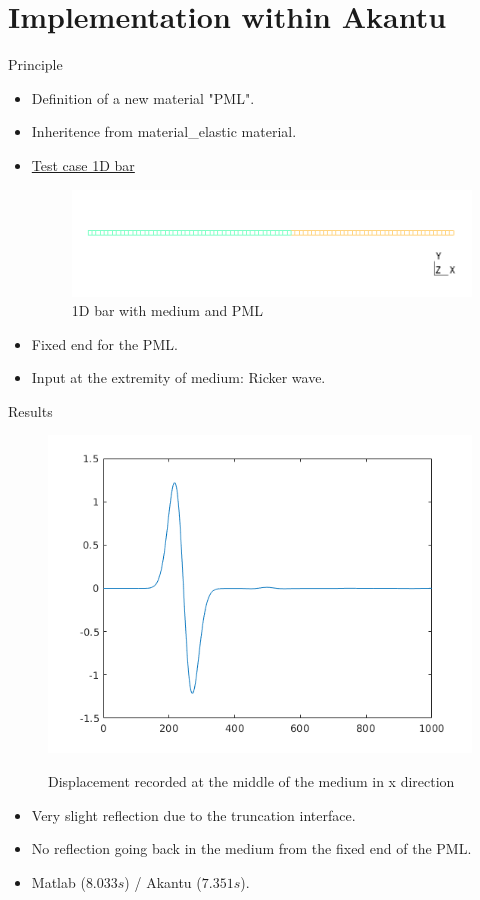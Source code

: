 \section{Implementation within Akantu}

\begin{frame}{Principle}
\centering
\begin{itemize}
\item Definition of a new material "PML".
\item Inheritence from material\_elastic material. 
\item \underline{Test case 1D bar}
\begin{figure}[ht]
\centering
\includegraphics[scale=0.33]{images/bar_pml.png}
\caption{1D bar with medium and PML}
\label{fig:bar}
\end{figure}
\item Fixed end for the PML.
\item Input at the extremity of medium: Ricker wave.
\end{itemize}

\end{frame}

\begin{frame}{Results}

\begin{figure}
  \centering
  \includegraphics[width=0.47\linewidth]{images/recordingx_50.png}
  \label{fig:recx}
  \caption{Displacement recorded at the middle of the medium in x direction}
\end{figure}
\pause
\begin{itemize}
\item Very slight reflection due to the truncation interface.
\item No reflection going back in the medium from the fixed end of the PML.
\item Matlab ($8.033s$) / Akantu ($7.351s$).
\end{itemize}
\end{frame}
